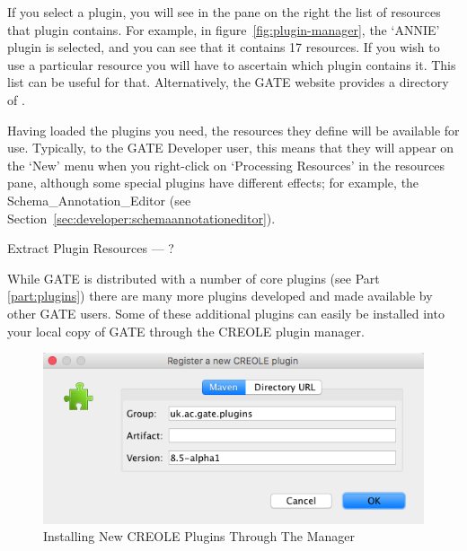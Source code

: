If you select a plugin, you will see in the pane on the right the list of
resources that plugin contains. For example, in figure~\ref{fig:plugin-manager},
the `ANNIE' plugin is selected, and you can see that it contains 17 resources.
If you wish to use a
particular resource you will have to ascertain which plugin contains it. This
list can be useful for that. Alternatively, the GATE website provides a directory
of .

Having loaded the plugins you need, the resources they define will be available
for use. Typically, to the GATE Developer user, this means that they will appear
on the `New' menu when you right-click on `Processing Resources' in the resources
pane, although some special plugins have different effects; for example, the
Schema\_Annotation\_Editor (see
Section~\ref{sec:developer:schemaannotationeditor}).



Extract Plugin Resources  --- ?




While GATE is distributed with a number of core plugins (see Part \ref{part:plugins})
there are many more plugins developed and made available by other GATE users.
Some of these additional plugins can easily be installed into your local copy of
GATE through the CREOLE plugin manager.


\begin{figure}[htb]
\begin{center}
\includegraphics[width=14cm]{registernewplugin.png}
\end{center}
\caption{Installing New CREOLE Plugins Through The Manager}
\label{fig:plugin-manager-config}
\end{figure}

